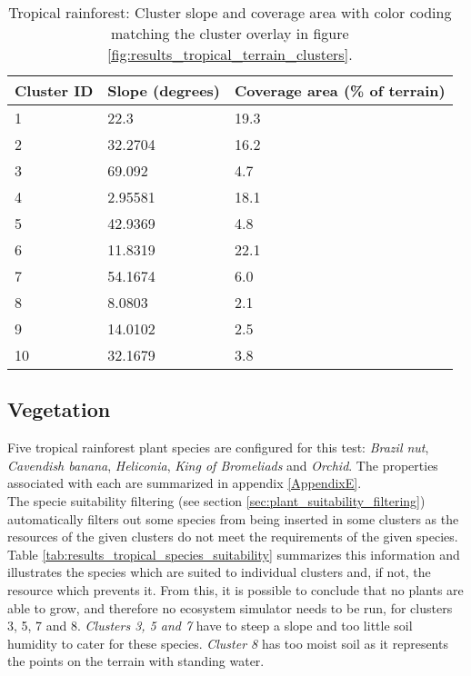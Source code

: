 \begin{table}[h]
  \centering
	    \begin{tabular}{|p{5cm}|p{5cm}|p{5cm}|}
		\hline	
  	    \textbf{Cluster ID} & \textbf{Slope (degrees)} & \textbf{Coverage area (\% of terrain)} \\
  	    \hline	
		\cellcolor{trop_cluster_1} 1 & 22.3 & 19.3 \\
		\hline
		\cellcolor{trop_cluster_2} 2 & 32.2704 & 16.2 \\
		\hline
		\cellcolor{trop_cluster_3} 3 & 69.092 & 4.7 \\
		\hline
		\cellcolor{trop_cluster_4}4 & 2.95581 & 18.1 \\
		\hline
		\cellcolor{trop_cluster_5} 5 & 42.9369 & 4.8 \\
		\hline
		\cellcolor{trop_cluster_6} 6 & 11.8319 & 22.1 \\
		\hline
		\cellcolor{trop_cluster_7} 7 & 54.1674 & 6.0 \\
		\hline
		\cellcolor{trop_cluster_8} 8 & 8.0803 & 2.1 \\
		\hline
		\cellcolor{trop_cluster_9} 9 & 14.0102 & 2.5 \\
		\hline
		\cellcolor{trop_cluster_10} 10 & 32.1679 & 3.8 \\
		\hline
		\end{tabular}
		\caption{Tropical rainforest: Cluster slope and coverage area with color coding matching the cluster overlay in figure \ref{fig:results_tropical_terrain_clusters}.}
	  \label{tab:results_tropical_cluster_slope_covarea}
\end{table}

\subsection{Vegetation}

Five tropical rainforest plant species are configured for this test: \textit{Brazil nut}, \textit{Cavendish banana}, \textit{Heliconia}, \textit{King of Bromeliads} and \textit{Orchid}. The properties associated with each are summarized in appendix \ref{AppendixE}.\\

The specie suitability filtering (see section \ref{sec:plant_suitability_filtering}) automatically filters out some species from being inserted in some clusters as the resources of the given clusters do not meet the requirements of the given species. Table \ref{tab:results_tropical_species_suitability} summarizes this information and illustrates the species which are suited to individual clusters and, if not, the resource which prevents it. From this, it is possible to conclude that no plants are able to grow, and therefore no ecosystem simulator needs to be run, for clusters 3, 5, 7 and 8. \textit{Clusters 3, 5 and 7} have to steep a slope and too little soil humidity to cater for these species. \textit{Cluster 8} has too moist soil as it represents the points on the terrain with standing water.\\

